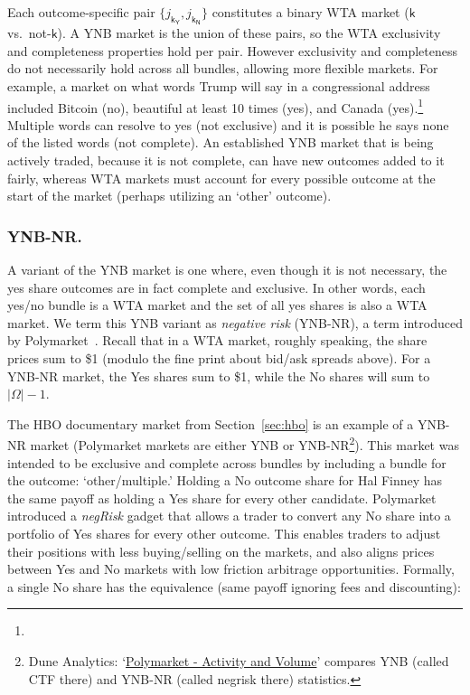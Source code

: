Each outcome-specific pair $\{j_{\mathsf{k_Y}}, j_{\mathsf{k_N}}\}$ constitutes a binary WTA market ($\mathsf{k}$ vs.\ not-$\mathsf{k}$). A YNB market is the union of these pairs, so the WTA exclusivity and completeness properties hold per pair. However exclusivity and completeness do not necessarily hold across all bundles, allowing more flexible markets. For example, a market on what words Trump will say in a congressional address included Bitcoin (no), beautiful at least 10 times (yes), and Canada (yes).\footnote{} Multiple words can resolve to yes (not exclusive) and it is possible he says none of the listed words (not complete). An established YNB market that is being actively traded, because it is not complete, can have new outcomes added to it fairly, whereas WTA markets must account for every possible outcome at the start of the market (perhaps utilizing an `other' outcome).

\subsubsection{YNB-NR.}

A variant of the YNB market is one where, even though it is not necessary, the yes share outcomes are in fact complete and exclusive. In other words, each yes/no bundle is a WTA market and the set of all yes shares is also a WTA market. We term this YNB variant as \textit{negative risk} (YNB-NR), a term introduced by Polymarket~\cite{poly}. Recall that in a WTA market, roughly speaking, the share prices sum to \$1 (modulo the fine print about bid/ask spreads above). For a YNB-NR market, the Yes shares sum to \$1, while the No shares will sum to $|\Omega|-1$. 

The HBO documentary market from Section~\ref{sec:hbo} is an example of a YNB-NR market (Polymarket markets are either YNB or YNB-NR\footnote{Dune Analytics: `\href{https://dune.com/filarm/polymarket-activity}{Polymarket - Activity and Volume}' compares YNB (called CTF there) and YNB-NR (called negrisk there) statistics.}). This market was intended to be exclusive and complete across bundles by including a bundle for the outcome: `other/multiple.' Holding a No outcome share for Hal Finney has the same payoff as holding a Yes share for every other candidate. Polymarket introduced a \textit{negRisk} gadget that allows a trader to convert any No share into a portfolio of Yes shares for every other outcome. This enables traders to adjust their positions with less buying/selling on the markets, and also aligns prices between Yes and No markets with low friction arbitrage opportunities. Formally, a single No share has the equivalence (\ie same payoff ignoring fees and discounting):

